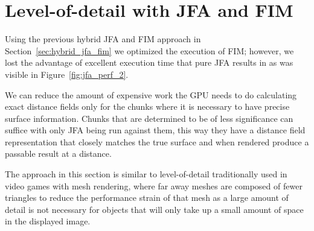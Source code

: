 \begin{table}[h]
    \centering
    \caption{Distance field compute shader execution time using hybrid JFA and FIM approach. Compared against a pure
        FIM execution.}
    \label{tab:hybrid_jfa_fim_perf}
\end{table}

\section{Level-of-detail with JFA and FIM} \label{sec:lod_jfa_fim}
Using the previous hybrid JFA and FIM approach in Section~\ref{sec:hybrid_jfa_fim} we optimized the execution of FIM;
however, we lost the advantage of excellent execution time that pure JFA results in as was visible in
Figure~\ref{fig:jfa_perf_2}.

We can reduce the amount of expensive work the GPU needs to do calculating exact distance fields only for the chunks
where it is necessary to have precise surface information. Chunks that are determined to be of less significance can
suffice with only JFA being run against them, this way they have a distance field representation that closely matches
the true surface and when rendered produce a passable result at a distance.

The approach in this section is similar to level-of-detail traditionally used in video games with mesh rendering, where
far away meshes are composed of fewer triangles to reduce the performance strain of that mesh as a large amount of
detail is not necessary for objects that will only take up a small amount of space in the displayed image.

